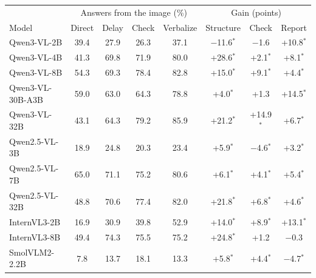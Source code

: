 \begin{tabular}{lcccc|ccc}
\toprule
 & \multicolumn{4}{c|}{Answers from the image (\%)} & \multicolumn{3}{c}{Gain (points)} \\
Model & Direct & Delay & Check & Verbalize & Structure & Check & Report \\
\midrule
Qwen3-VL-2B & 39.4 & 27.9 & 26.3 & 37.1 & $-$11.6$^{\ast}$ & $-$1.6 & +10.8$^{\ast}$ \\
Qwen3-VL-4B & 41.3 & 69.8 & 71.9 & 80.0 & +28.6$^{\ast}$ & +2.1$^{\ast}$ & +8.1$^{\ast}$ \\
Qwen3-VL-8B & 54.3 & 69.3 & 78.4 & 82.8 & +15.0$^{\ast}$ & +9.1$^{\ast}$ & +4.4$^{\ast}$ \\
Qwen3-VL-30B-A3B & 59.0 & 63.0 & 64.3 & 78.8 & +4.0$^{\ast}$ & +1.3 & +14.5$^{\ast}$ \\
Qwen3-VL-32B & 43.1 & 64.3 & 79.2 & 85.9 & +21.2$^{\ast}$ & +14.9$^{\ast}$ & +6.7$^{\ast}$ \\
\midrule
Qwen2.5-VL-3B & 18.9 & 24.8 & 20.3 & 23.4 & +5.9$^{\ast}$ & $-$4.6$^{\ast}$ & +3.2$^{\ast}$ \\
Qwen2.5-VL-7B & 65.0 & 71.1 & 75.2 & 80.6 & +6.1$^{\ast}$ & +4.1$^{\ast}$ & +5.4$^{\ast}$ \\
Qwen2.5-VL-32B & 48.8 & 70.6 & 77.4 & 82.0 & +21.8$^{\ast}$ & +6.8$^{\ast}$ & +4.6$^{\ast}$ \\
\midrule
InternVL3-2B & 16.9 & 30.9 & 39.8 & 52.9 & +14.0$^{\ast}$ & +8.9$^{\ast}$ & +13.1$^{\ast}$ \\
InternVL3-8B & 49.4 & 74.3 & 75.5 & 75.2 & +24.8$^{\ast}$ & +1.2 & $-$0.3 \\
\midrule
SmolVLM2-2.2B & 7.8 & 13.7 & 18.1 & 13.3 & +5.8$^{\ast}$ & +4.4$^{\ast}$ & $-$4.7$^{\ast}$ \\
\bottomrule
\end{tabular}
